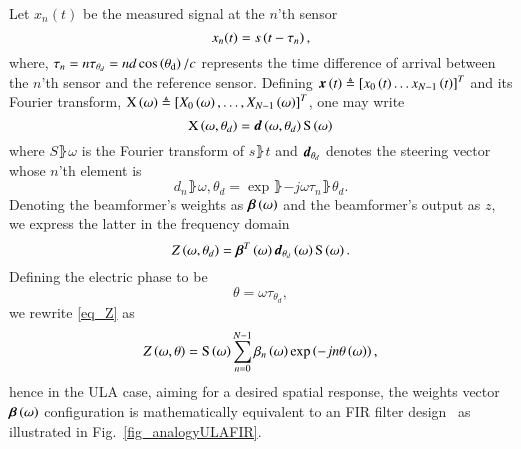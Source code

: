 Let $x_{n}(t)$ be the measured signal at the $n$'th sensor
\begin{equation}
x_{n}(t) = s\left({t-\tau_{n}}\right),
\label{eqn:noFeedbackULA_singleSensor_temporal}
\end{equation}
where, $\tau_{n}=n\tau_{\theta_{d}}=nd\cos\left({\theta_{\text{d}}}\right)/c$ represents the time difference of arrival between the $n$'th sensor and the reference sensor.
Defining $\boldsymbol{x}\left({t}\right)\triangleq\left[{x_{0}\left({t}\right)\hdots{}x_{N-1}\left({t}\right)}\right]^{T}$ and its Fourier transform, $\vecnot{\F{x}}\rBrace{\omega}\triangleq\vBrace{X_{0}\rBrace{\omega},\hdots,X_{N-1}\rBrace{\omega}}^{T}$, one may write 
\[
\vecnot{\F{x}}\rBrace{\omega,\theta_{d}}=\vecnot{d}\rBrace{\omega,\theta_{d}}\F{s}\rBrace{\omega}
\]
where $S\rBrace{\omega}$ is the Fourier transform of $s\rBrace{t}$ and $\boldsymbol{d}_{\theta_{d}}$ denotes the steering vector whose $n$'th element is
\begin{equation}
    \label{eq:d}
    d_{n}\rBrace{\omega,\theta_{d}} = \exp{\rBrace{-j\omega\tau_{n}\rBrace{\theta_{d}}}}.
\end{equation}
Denoting the beamformer's weights as $\boldsymbol{\beta}\left({\omega}\right)$ and the beamformer's output as $z$, we express the latter in the frequency domain
\begin{equation}
    \label{eq_Z}
    Z\rBrace{\omega,\theta_{d}} = \vecnot{\beta}^{T}\rBrace{\omega}\vecnot{d}_{\theta_{d}}\rBrace{\omega}\F{s}\rBrace{\omega}.
\end{equation}
Defining the electric phase to be
\begin{equation}\label{eq:thetaULA}
\theta=\omega\tau_{\theta_{d}},
\end{equation}
we rewrite \eqref{eq_Z} as 
\[
Z\rBrace{\omega,\theta} = \F{s}\rBrace{\omega}\sum_{n=0}^{N-1}\beta_{n}\rBrace{\omega}\exp\Brack{-jn\theta\rBrace{\omega}},
\]
hence in the ULA case, aiming for a desired spatial response, the weights vector $\boldsymbol{\beta}\left({\omega}\right)$ configuration is mathematically equivalent to an FIR filter design~\cite{van1988beamforming,benesty2018} as illustrated in Fig.~\ref{fig_analogyULAFIR}.
